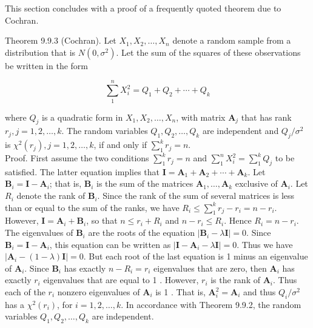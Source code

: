 This section concludes with a proof of a frequently quoted theorem due to Cochran.

Theorem 9.9.3 (Cochran). Let $X_{1}, X_{2}, \ldots, X_{n}$ denote a random sample from a distribution that is $N\left(0, \sigma^{2}\right)$. Let the sum of the squares of these observations be written in the form

$$
\sum_{1}^{n} X_{i}^{2}=Q_{1}+Q_{2}+\cdots+Q_{k}
$$

where $Q_{j}$ is a quadratic form in $X_{1}, X_{2}, \ldots, X_{n}$, with matrix $\boldsymbol{A}_{j}$ that has rank $r_{j}, j=1,2, \ldots, k$. The random variables $Q_{1}, Q_{2}, \ldots, Q_{k}$ are independent and $Q_{j} / \sigma^{2}$ is $\chi^{2}\left(r_{j}\right), j=1,2, \ldots, k$, if and only if $\sum_{1}^{k} r_{j}=n$.\\
Proof. First assume the two conditions $\sum_{1}^{k} r_{j}=n$ and $\sum_{1}^{n} X_{i}^{2}=\sum_{1}^{k} Q_{j}$ to be satisfied. The latter equation implies that $\boldsymbol{I}=\boldsymbol{A}_{1}+\boldsymbol{A}_{2}+\cdots+\boldsymbol{A}_{k}$. Let $\boldsymbol{B}_{i}=\boldsymbol{I}-\boldsymbol{A}_{i}$; that is, $\boldsymbol{B}_{i}$ is the sum of the matrices $\boldsymbol{A}_{1}, \ldots, \boldsymbol{A}_{k}$ exclusive of $\boldsymbol{A}_{i}$. Let $R_{i}$ denote the rank of $\boldsymbol{B}_{i}$. Since the rank of the sum of several matrices is less than or equal to the sum of the ranks, we have $R_{i} \leq \sum_{1}^{k} r_{j}-r_{i}=n-r_{i}$. However, $\boldsymbol{I}=\boldsymbol{A}_{i}+\boldsymbol{B}_{i}$, so that $n \leq r_{i}+R_{i}$ and $n-r_{i} \leq R_{i}$. Hence $R_{i}=n-r_{i}$. The eigenvalues of $\boldsymbol{B}_{i}$ are the roots of the equation $\left|\boldsymbol{B}_{i}-\lambda \boldsymbol{I}\right|=0$. Since $\boldsymbol{B}_{i}=\boldsymbol{I}-\boldsymbol{A}_{i}$, this equation can be written as $\left|\boldsymbol{I}-\boldsymbol{A}_{i}-\lambda \boldsymbol{I}\right|=0$. Thus we have $\left|\boldsymbol{A}_{i}-(1-\lambda) \boldsymbol{I}\right|=0$. But each root of the last equation is 1 minus an eigenvalue of $\boldsymbol{A}_{i}$. Since $\boldsymbol{B}_{i}$ has exactly $n-R_{i}=r_{i}$ eigenvalues that are zero, then $\boldsymbol{A}_{i}$ has exactly $r_{i}$ eigenvalues that are equal to 1 . However, $r_{i}$ is the rank of $\boldsymbol{A}_{i}$. Thus each of the $r_{i}$ nonzero eigenvalues of $\boldsymbol{A}_{i}$ is 1 . That is, $\boldsymbol{A}_{i}^{2}=\boldsymbol{A}_{i}$ and thus $Q_{i} / \sigma^{2}$ has a $\chi^{2}\left(r_{i}\right)$, for $i=1,2, \ldots, k$. In accordance with Theorem 9.9.2, the random variables $Q_{1}, Q_{2}, \ldots, Q_{k}$ are independent.

